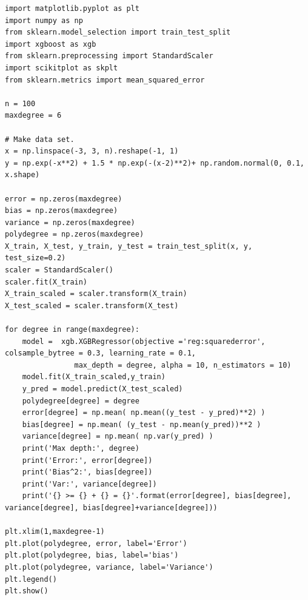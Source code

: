 \documentclass[%
oneside,                 %
final,                   %
10pt]{article}
\begin{document}
\begin{verbatim}
import matplotlib.pyplot as plt
import numpy as np
from sklearn.model_selection import train_test_split
import xgboost as xgb
from sklearn.preprocessing import StandardScaler
import scikitplot as skplt
from sklearn.metrics import mean_squared_error

n = 100
maxdegree = 6

# Make data set.
x = np.linspace(-3, 3, n).reshape(-1, 1)
y = np.exp(-x**2) + 1.5 * np.exp(-(x-2)**2)+ np.random.normal(0, 0.1, x.shape)

error = np.zeros(maxdegree)
bias = np.zeros(maxdegree)
variance = np.zeros(maxdegree)
polydegree = np.zeros(maxdegree)
X_train, X_test, y_train, y_test = train_test_split(x, y, test_size=0.2)
scaler = StandardScaler()
scaler.fit(X_train)
X_train_scaled = scaler.transform(X_train)
X_test_scaled = scaler.transform(X_test)

for degree in range(maxdegree):
    model =  xgb.XGBRegressor(objective ='reg:squarederror', colsample_bytree = 0.3, learning_rate = 0.1,
                max_depth = degree, alpha = 10, n_estimators = 10)
    model.fit(X_train_scaled,y_train)
    y_pred = model.predict(X_test_scaled)
    polydegree[degree] = degree
    error[degree] = np.mean( np.mean((y_test - y_pred)**2) )
    bias[degree] = np.mean( (y_test - np.mean(y_pred))**2 )
    variance[degree] = np.mean( np.var(y_pred) )
    print('Max depth:', degree)
    print('Error:', error[degree])
    print('Bias^2:', bias[degree])
    print('Var:', variance[degree])
    print('{} >= {} + {} = {}'.format(error[degree], bias[degree], variance[degree], bias[degree]+variance[degree]))

plt.xlim(1,maxdegree-1)
plt.plot(polydegree, error, label='Error')
plt.plot(polydegree, bias, label='bias')
plt.plot(polydegree, variance, label='Variance')
plt.legend()
plt.show()


\end{verbatim}



\end{document}
